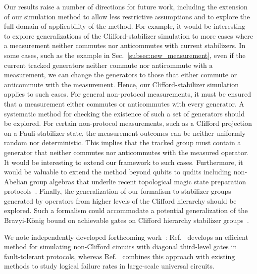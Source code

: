\documentclass[
 reprint,
 amsmath,amssymb,
 pra,superscriptaddress, nofootinbib
]{revtex4-2}
\theoremstyle{definition}
\theoremstyle{plain}
\begin{document}
Our results raise a number of directions for future work, including the extension of our simulation method to allow less restrictive assumptions and to explore the full domain of applicability of the method. 
For example, it would be interesting to explore generalizations of the Clifford-stabilizer simulation to more cases where a measurement neither commutes nor anticommutes with current stabilizers.
In some cases, such as the example in Sec.~\ref{subsec:new_measurement}, even if the current tracked generators neither commute nor anticommute with a measurement, we can change the generators to those that either commute or anticommute with  the measurement. Hence, our Clifford-stabilizer simulation applies to such cases.
For general non-protocol measurements, it must be ensured that a measurement either commutes or anticommutes with every generator. A systematic method for checking the existence of such a set of generators should be explored. 
For certain non-protocol measurements, such as a Clifford projection on a Pauli-stabilizer state, the measurement outcomes can be neither uniformly random nor deterministic. This implies that the tracked group must contain a generator that neither commutes nor anticommutes with the measured operator.
It would be interesting to extend our framework to such cases.
Furthermore, it would be valuable to extend the method beyond qubits to qudits including non-Abelian group algebras that underlie recent topological magic state preparation protocols~\cite{huang2025generatinglogicalmagicstates,huang2026hybridlatticesurgerynonclifford,manjunath2026universalquantumcomputationgroup}. 
Finally, the generalization of our formalism to stabilizer groups generated by operators from higher levels of the Clifford hierarchy should be explored. 
Such a formalism could accommodate a potential generalization of the Bravyi-K\"onig bound on achievable gates on Clifford hierarchy stabilizer groups~\cite{PhysRevLett.110.170503}. 

We note independently developed forthcoming  work~\cite{julio_upcoming,tom_upcoming}: Ref.~\cite{julio_upcoming} develops an efficient method for simulating non-Clifford circuits with diagonal third-level gates in fault-tolerant protocols, whereas Ref.~\cite{tom_upcoming} combines this approach with existing methods to study logical failure rates in large-scale universal circuits.
\end{document}
